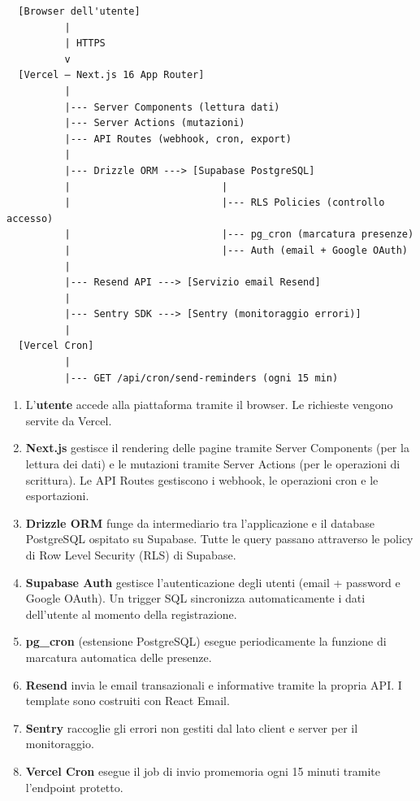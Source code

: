 \documentclass[a4paper,11pt,oneside]{book}
\begin{document}
\begin{tcolorbox}[
  enhanced,
  colback=namoGray,
  colframe=namoCharcoal,
  width=\textwidth,
  arc=6pt,
  boxrule=0.8pt,
  left=10pt, right=10pt, top=10pt, bottom=10pt,
]
\small
\begin{verbatim}
  [Browser dell'utente]
          |
          | HTTPS
          v
  [Vercel — Next.js 16 App Router]
          |
          |--- Server Components (lettura dati)
          |--- Server Actions (mutazioni)
          |--- API Routes (webhook, cron, export)
          |
          |--- Drizzle ORM ---> [Supabase PostgreSQL]
          |                          |
          |                          |--- RLS Policies (controllo accesso)
          |                          |--- pg_cron (marcatura presenze)
          |                          |--- Auth (email + Google OAuth)
          |
          |--- Resend API ---> [Servizio email Resend]
          |
          |--- Sentry SDK ---> [Sentry (monitoraggio errori)]
          |
  [Vercel Cron]
          |
          |--- GET /api/cron/send-reminders (ogni 15 min)
\end{verbatim}
\end{tcolorbox}

\begin{enumerate}[leftmargin=1.5em]
  \item L'\textbf{utente} accede alla piattaforma tramite il browser. Le richieste vengono servite da Vercel.
  \item \textbf{Next.js} gestisce il rendering delle pagine tramite Server Components (per la lettura dei dati) e le mutazioni tramite Server Actions (per le operazioni di scrittura). Le API Routes gestiscono i webhook, le operazioni cron e le esportazioni.
  \item \textbf{Drizzle ORM} funge da intermediario tra l'applicazione e il database PostgreSQL ospitato su Supabase. Tutte le query passano attraverso le policy di Row Level Security (RLS) di Supabase.
  \item \textbf{Supabase Auth} gestisce l'autenticazione degli utenti (email + password e Google OAuth). Un trigger SQL sincronizza automaticamente i dati dell'utente al momento della registrazione.
  \item \textbf{pg\_cron} (estensione PostgreSQL) esegue periodicamente la funzione di marcatura automatica delle presenze.
  \item \textbf{Resend} invia le email transazionali e informative tramite la propria API. I template sono costruiti con React Email.
  \item \textbf{Sentry} raccoglie gli errori non gestiti dal lato client e server per il monitoraggio.
  \item \textbf{Vercel Cron} esegue il job di invio promemoria ogni 15 minuti tramite l'endpoint protetto.
\end{enumerate}
\end{document}
